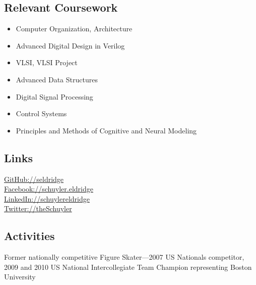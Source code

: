 \documentclass[letterpage]{article}
\begin{document}
\begin{minipage}[t]{0.36\textwidth}
  \subsection*{Relevant Coursework}
  \vspace{-5pt}
  \begin{itemize}\setlength\itemsep{0pt}
  \item Computer Organization, Architecture
  \item Advanced Digital Design in Verilog
  \item VLSI, VLSI Project
  \item Advanced Data Structures
  \item Digital Signal Processing
  \item Control Systems
  \item Principles and Methods of Cognitive and Neural Modeling
  \end{itemize}

  \vspace{-5pt}

  \subsection*{Links}
  \vspace{-5pt}
  \href{http://www.github.com/seldridge}{GitHub://seldridge}\\
  \href{http://www.facebook.com/schuyler.eldridge}{Facebook://schuyler.eldridge}\\
  \href{http://www.linkedin.com/in/schuylereldridge}{LinkedIn://schuylereldridge}\\
  \href{http://www.twitter.com/theSchuyler}{Twitter://theSchuyler}

  \subsection*{Activities}
  \vspace{-5pt} Former nationally competitive Figure Skater---2007 US
  Nationals competitor, 2009 and 2010 US National Intercollegiate Team
  Champion representing Boston University

\end{minipage}\hfill
\end{document}

